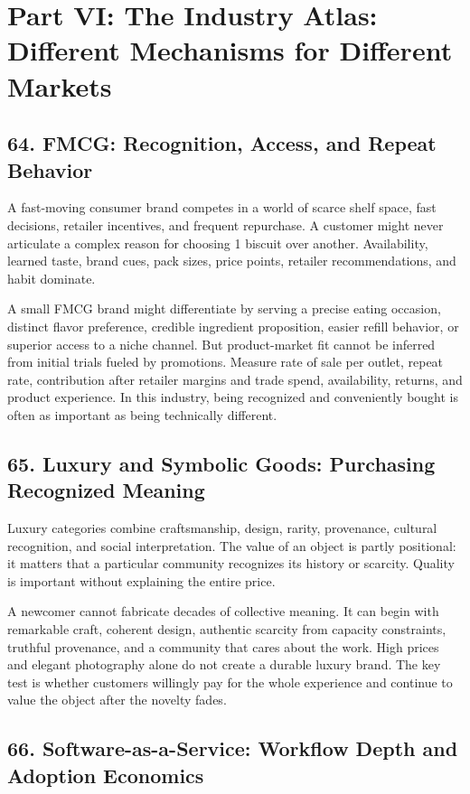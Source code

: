 \section*{Part VI: The Industry Atlas: Different Mechanisms for Different Markets}

\subsection*{64. FMCG: Recognition, Access, and Repeat Behavior}

A fast-moving consumer brand competes in a world of scarce shelf space, fast decisions, retailer incentives, and frequent repurchase. A customer might never articulate a complex reason for choosing 1 biscuit over another. Availability, learned taste, brand cues, pack sizes, price points, retailer recommendations, and habit dominate.

A small FMCG brand might differentiate by serving a precise eating occasion, distinct flavor preference, credible ingredient proposition, easier refill behavior, or superior access to a niche channel. But product-market fit cannot be inferred from initial trials fueled by promotions. Measure rate of sale per outlet, repeat rate, contribution after retailer margins and trade spend, availability, returns, and product experience. In this industry, being recognized and conveniently bought is often as important as being technically different.

\subsection*{65. Luxury and Symbolic Goods: Purchasing Recognized Meaning}

Luxury categories combine craftsmanship, design, rarity, provenance, cultural recognition, and social interpretation. The value of an object is partly positional: it matters that a particular community recognizes its history or scarcity. Quality is important without explaining the entire price.

A newcomer cannot fabricate decades of collective meaning. It can begin with remarkable craft, coherent design, authentic scarcity from capacity constraints, truthful provenance, and a community that cares about the work. High prices and elegant photography alone do not create a durable luxury brand. The key test is whether customers willingly pay for the whole experience and continue to value the object after the novelty fades.

\subsection*{66. Software-as-a-Service: Workflow Depth and Adoption Economics}

